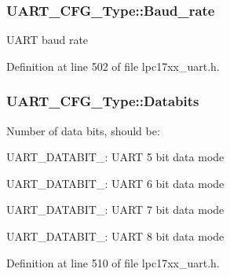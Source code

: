 \subsubsection[{\texorpdfstring{Baud\+\_\+rate}{Baud_rate}}]{ U\+A\+R\+T\+\_\+\+C\+F\+G\+\_\+\+Type\+::\+Baud\+\_\+rate}\hypertarget{struct_u_a_r_t___c_f_g___type_a7065cb976e4b4d0affc0ee94113eebb2}{}\label{struct_u_a_r_t___c_f_g___type_a7065cb976e4b4d0affc0ee94113eebb2}
U\+A\+RT baud rate 

Definition at line 502 of file lpc17xx\+\_\+uart.\+h.

\subsubsection[{\texorpdfstring{Databits}{Databits}}]{ U\+A\+R\+T\+\_\+\+C\+F\+G\+\_\+\+Type\+::\+Databits}\hypertarget{struct_u_a_r_t___c_f_g___type_a9186b2309198fd63e0ef9d078c265220}{}\label{struct_u_a_r_t___c_f_g___type_a9186b2309198fd63e0ef9d078c265220}
Number of data bits, should be\+:
\begin{DoxyItemize}
\item U\+A\+R\+T\+\_\+\+D\+A\+T\+A\+B\+I\+T\+\_\+: U\+A\+RT 5 bit data mode
\item U\+A\+R\+T\+\_\+\+D\+A\+T\+A\+B\+I\+T\+\_\+: U\+A\+RT 6 bit data mode
\item U\+A\+R\+T\+\_\+\+D\+A\+T\+A\+B\+I\+T\+\_\+: U\+A\+RT 7 bit data mode
\item U\+A\+R\+T\+\_\+\+D\+A\+T\+A\+B\+I\+T\+\_\+: U\+A\+RT 8 bit data mode 
\end{DoxyItemize}

Definition at line 510 of file lpc17xx\+\_\+uart.\+h.

